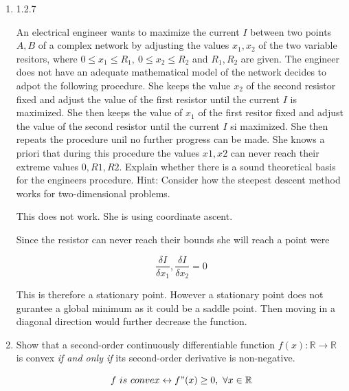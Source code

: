 \documentclass[11pt,letterpaper]{article}
\begin{document}
\begin{enumerate}
	\[ u_{k+1} = \sqrt{u_k (1 - u_k)} \]

	\[u_{k+1}^2 = u_k(1 - u_k) > u_k \]

	Therefore as \[ u_k \rightarrow 0 \]
	$f$ begins to move away from 0.

	\[ r_k = c^2 u_k^2 = \|x_k\| \]

	So if  $u_k$ does not converge to 
	zero then $x_k$ does not either.

	\item 1.2.7

	An electrical engineer wants to maximize the current $I$
	between two points $A, B$ of a complex network by adjusting
	the values $x_1, x_2$ of the two variable resitors, 
	where $0 \leq x_1 \leq R_1, \ 0 \leq x_2 \leq R_2$
	and $R_1, R_2$ are given. 
	The engineer does not have an adequate mathematical model
	of the network decides to adpot the following procedure.
	She keeps the value $x_2$ of the second resistor fixed
	and adjust the value of the first resistor until the
	current $I$ is maximized.
	She then keeps the value of $x_1$ of the first resitor 
	fixed and adjust the value of the second resistor until
	the current $I$ si maximized.
	She then repeats the procedure unil no further progress
	can be made.
	She knows a priori that during this procedure the values 
	$x1, x2$ can never reach their extreme values $0, R1, R2$.
	Explain whether there is a sound theoretical basis for the
	engineers procedure.
	Hint: Consider how the steepest descent method works for 
	two-dimensional problems.

	This does not work. She is using coordinate ascent.

	Since the resistor can never reach their bounds she
	will reach a point were 

	\[ \frac{\delta I}{\delta x_1}, 
	\frac{\delta I}{\delta x_2} = 0 \]

	This is therefore a stationary point.
	However a stationary point does not gurantee
	a global minimum as it could be a saddle point.
	Then moving in a diagonal direction would
	further decrease the function.



	\item  Show that a second-order continuously 
	differentiable function 
	$f(x):\mathbb{R}\to \mathbb{R}$ 
	is convex {\it if and only if} 
	its second-order derivative is non-negative.

	\[ f \ is \ convex \leftrightarrow f"(x) \geq 0, \
	\forall x \in \mathbb{R} \]


\end{enumerate}
\end{document}
